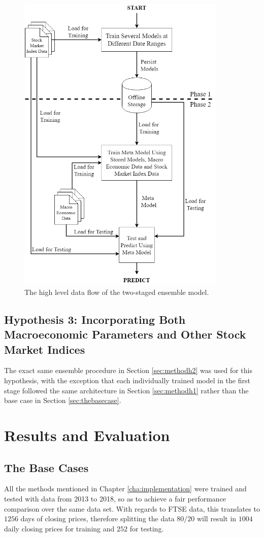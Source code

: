 \documentclass{UoYCSproject}
\begin{document}
\begin{figure}[h]
\includegraphics[width=10cm]{Meta-model.png}
\centering
\caption{The high level data flow of the two-staged ensemble model.} 
\label{fig:metamodelflow}
\end{figure}


\section{Hypothesis 3: Incorporating Both Macroeconomic Parameters and Other Stock Market Indices}
\label{sec:methodh3}
The exact same ensemble procedure in Section \ref{sec:methodh2} was used for this hypothesis, with the exception that each individually trained model in the first stage followed the same architecture in Section \ref{sec:methodh1} rather than the base case in Section \ref{sec:thebasecase}. 


\chapter{Results and Evaluation}
\label{cha:resultsandevaluation}
\section{The Base Cases}
\label{sec:resbasecase}
All the methods mentioned in Chapter \ref{cha:implementation} were trained and tested with data from 2013 to 2018, so as to achieve a fair performance comparison over the same data set. With regards to FTSE data, this translates to $1256$ days of closing prices, therefore splitting the data $80/20$ will result in $1004$ daily closing prices for training and $252$ for testing.
\end{document}
